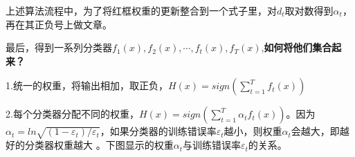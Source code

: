 \documentclass[UTF8]{ctexart} %
\begin{document}
			\begin{figure}[H]
			\end{figure}
			上述算法流程中，为了将红框权重的更新整合到一个式子里，对$d_t$取对数得到$\alpha_t$，再在其正负号上做文章。
			
			最后，得到一系列分类器${f_1(x),f_2(x),\cdots, f_t(x),f_T(x)}$,\textbf{如何将他们集合起来？}
			
			\quad 1.统一的权重，将输出相加，取正负，$H(x)=sign(\sum_{t=1}^Tf_t(x))$
			
			\quad 2.每个分类器分配不同的权重，$H(x)=sign(\sum_{t=1}^T\alpha_tf_t(x))$。因为$\alpha_t=ln\sqrt{(1-\varepsilon_t)/\varepsilon_t}$，如果分类器的训练错误率$\varepsilon_t$越小，则权重$\alpha_t$会越大，即越好的分类器权重越大 。下图显示的权重$\alpha_t$与训练错误率$\varepsilon_t$的关系。
			\begin{figure}[H]
			\end{figure}
			
\end{document}
